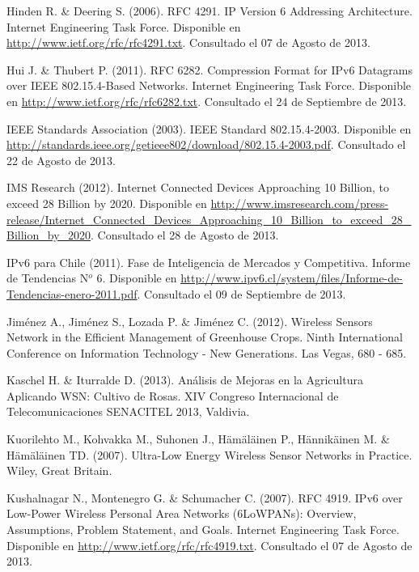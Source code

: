 \begin{spacing}{1.0}
\begin{thebibliography}{99}
Hinden R. \& Deering S. (2006).
\newblock RFC 4291. IP Version 6 Addressing Architecture. Internet Engineering Task Force.
\newblock Disponible en \url{http://www.ietf.org/rfc/rfc4291.txt}.
\newblock Consultado el 07 de Agosto de 2013.

Hui J. \& Thubert P. (2011).
\newblock RFC 6282. Compression Format for IPv6 Datagrams over IEEE 802.15.4-Based Networks. Internet Engineering Task Force.
\newblock Disponible en \url{http://www.ietf.org/rfc/rfc6282.txt}.
\newblock Consultado el 24 de Septiembre de 2013.

IEEE Standards Association (2003).
\newblock IEEE Standard 802.15.4-2003.
\newblock Disponible en \url{http://standards.ieee.org/getieee802/download/802.15.4-2003.pdf}.
\newblock Consultado el 22 de Agosto de 2013.

IMS Research (2012).
\newblock Internet Connected Devices Approaching 10 Billion, to exceed 28 Billion by 2020.
\newblock Disponible en \url{http://www.imsresearch.com/press-release/Internet_Connected_Devices_Approaching_10_Billion_to_exceed_28_Billion_by_2020}.
\newblock Consultado el 28 de Agosto de 2013.

IPv6 para Chile (2011).
\newblock Fase de Inteligencia de Mercados y Competitiva. Informe de Tendencias N$^{o}$ 6.
\newblock Disponible en \url{http://www.ipv6.cl/system/files/Informe-de-Tendencias-enero-2011.pdf}.
\newblock Consultado el 09 de Septiembre de 2013.

Jiménez A., Jiménez S., Lozada P. \& Jiménez C. (2012).
\newblock Wireless Sensors Network in the Efficient Management of Greenhouse Crops.
 Ninth International Conference on Information Technology - New Generations.
\newblock Las Vegas, 680 - 685. 

Kaschel H. \& Iturralde D. (2013).
\newblock Análisis de Mejoras en la Agricultura Aplicando WSN: Cultivo de Rosas.
\newblock XIV Congreso Internacional de Telecomunicaciones SENACITEL 2013,
\newblock Valdivia. 

Kuorilehto M., Kohvakka M., Suhonen J., Hämäläinen P., Hännikäinen M. \& Hämäläinen TD. (2007).
\newblock Ultra-Low Energy Wireless Sensor Networks in Practice.
\newblock Wiley, Great Britain.

Kushalnagar N., Montenegro G. \& Schumacher C. (2007).
\newblock RFC 4919. IPv6 over Low-Power Wireless Personal Area Networks (6LoWPANs): Overview, Assumptions, Problem Statement, and Goals. Internet Engineering Task Force.
\newblock Disponible en \url{http://www.ietf.org/rfc/rfc4919.txt}.
\newblock Consultado el 07 de Agosto de 2013.


\end{thebibliography}
\end{spacing}
